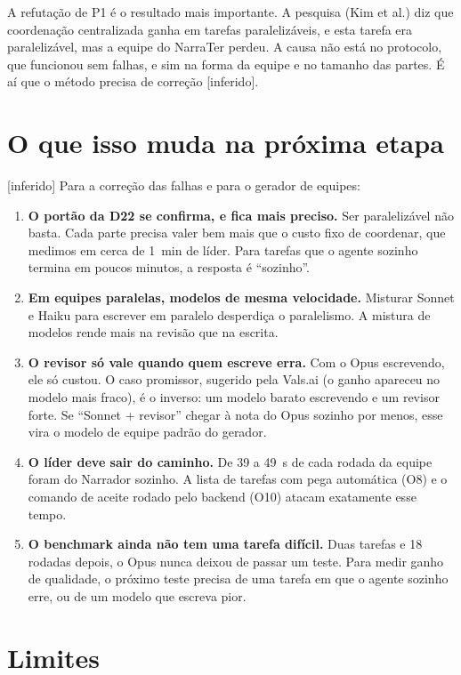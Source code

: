 \documentclass[11pt,a4paper]{article}
\newcommand{\rot}[1]{\textsf{\footnotesize[#1]}}
\begin{document}
A refutação de P1 é o resultado mais importante. A pesquisa (Kim et al.) diz que coordenação centralizada
ganha em tarefas paralelizáveis, e esta tarefa era paralelizável, mas a equipe do NarraTer perdeu. A causa
não está no protocolo, que funcionou sem falhas, e sim na forma da equipe e no tamanho das partes. É
aí que o método precisa de correção \rot{inferido}.

\section{O que isso muda na próxima etapa}

\rot{inferido} Para a correção das falhas e para o gerador de equipes:
\begin{enumerate}
  \item \textbf{O portão da D22 se confirma, e fica mais preciso.} Ser paralelizável não basta. Cada parte
    precisa valer bem mais que o custo fixo de coordenar, que medimos em cerca de 1~min de líder. Para
    tarefas que o agente sozinho termina em poucos minutos, a resposta é ``sozinho''.
  \item \textbf{Em equipes paralelas, modelos de mesma velocidade.} Misturar Sonnet e Haiku para escrever
    em paralelo desperdiça o paralelismo. A mistura de modelos rende mais na revisão que na escrita.
  \item \textbf{O revisor só vale quando quem escreve erra.} Com o Opus escrevendo, ele só custou. O caso
    promissor, sugerido pela Vals.ai (o ganho apareceu no modelo mais fraco), é o inverso: um modelo
    barato escrevendo e um revisor forte. Se ``Sonnet + revisor'' chegar à nota do Opus sozinho por menos,
    esse vira o modelo de equipe padrão do gerador.
  \item \textbf{O líder deve sair do caminho.} De 39 a 49~s de cada rodada da equipe foram do Narrador
    sozinho. A lista de tarefas com pega automática (O8) e o comando de aceite rodado pelo backend (O10)
    atacam exatamente esse tempo.
  \item \textbf{O benchmark ainda não tem uma tarefa difícil.} Duas tarefas e 18 rodadas depois, o Opus
    nunca deixou de passar um teste. Para medir ganho de qualidade, o próximo teste precisa de uma tarefa
    em que o agente sozinho erre, ou de um modelo que escreva pior.
\end{enumerate}

\section{Limites}
\end{document}
